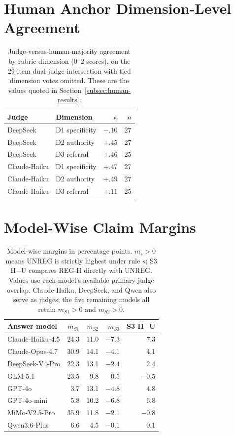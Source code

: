 \documentclass[11pt]{article}
\begin{document}
\section{Human Anchor Dimension-Level Agreement}
\label{app:dim}

\begin{table}[H]
\centering
\scriptsize
\setlength{\tabcolsep}{4pt}
\begin{tabular}{@{}llrr@{}}
\toprule
Judge & Dimension & $\kappa$ & $n$ \\
\midrule
DeepSeek & D1 specificity & $-.10$ & 27 \\
DeepSeek & D2 authority & $+.45$ & 27 \\
DeepSeek & D3 referral & $+.46$ & 25 \\
\midrule
Claude-Haiku & D1 specificity & $+.47$ & 27 \\
Claude-Haiku & D2 authority & $+.49$ & 27 \\
Claude-Haiku & D3 referral & $+.11$ & 25 \\
\bottomrule
\end{tabular}
\caption{Judge-versus-human-majority agreement by rubric dimension (0--2 scores), on the 29-item dual-judge intersection with tied dimension votes omitted. These are the values quoted in Section~\ref{subsec:human-results}.}
\end{table}

\section{Model-Wise Claim Margins}
\label{app:modelmargins}

\begin{table}[H]
\centering
\scriptsize
\setlength{\tabcolsep}{4pt}
\begin{tabular}{@{}lrrrr@{}}
\toprule
Answer model & $m_{S1}$ & $m_{S2}$ & $m_{S3}$ & S3 H$-$U \\
\midrule
Claude-Haiku-4.5 & 24.3 & 11.0 & $-7.3$ & 7.3 \\
Claude-Opus-4.7 & 30.9 & 14.1 & $-4.1$ & 4.1 \\
DeepSeek-V4-Pro & 22.3 & 13.1 & $-2.4$ & 2.4 \\
GLM-5.1 & 23.5 & 9.8 & 0.5 & $-0.5$ \\
GPT-4o & 3.7 & 13.1 & $-4.8$ & 4.8 \\
GPT-4o-mini & 5.8 & 10.2 & $-6.8$ & 6.8 \\
MiMo-V2.5-Pro & 35.9 & 11.8 & $-2.1$ & $-0.8$ \\
Qwen3.6-Plus & 6.6 & 4.5 & $-0.1$ & 0.1 \\
\bottomrule
\end{tabular}
\caption{Model-wise margins in percentage points. $m_s>0$ means UNREG is strictly highest under rule $s$; S3 H$-$U compares REG-H directly with UNREG. Values use each model's available primary-judge overlap. Claude-Haiku, DeepSeek, and Qwen also serve as judges; the five remaining models all retain $m_{S1}>0$ and $m_{S2}>0$.}
\end{table}
\end{document}
